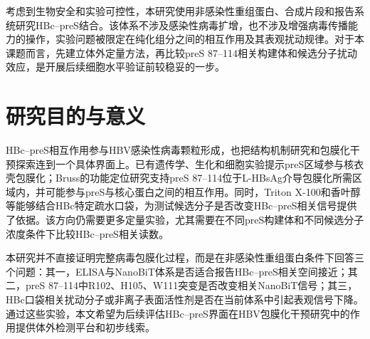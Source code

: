 考虑到生物安全和实验可控性，本研究使用非感染性重组蛋白、合成片段和报告系统研究HBc--preS结合。该体系不涉及感染性病毒扩增，也不涉及增强病毒传播能力的操作，实验问题被限定在纯化组分之间的相互作用及其表观扰动规律。对于本课题而言，先建立体外定量方法，再比较preS 87--114相关构建体和候选分子扰动效应，是开展后续细胞水平验证前较稳妥的一步。

\section{研究目的与意义}

HBc--preS相互作用参与HBV感染性病毒颗粒形成，也把结构机制研究和包膜化干预探索连到一个具体界面上。已有遗传学、生化和细胞实验提示preS区域参与核衣壳包膜化；Bruss的功能定位研究支持preS 87--114位于L-HBsAg介导包膜化所需区域内，并可能参与preS与核心蛋白之间的相互作用\cite{bruss1997short}。同时，Triton X-100和香叶醇等能够结合HBc特定疏水口袋\cite{makbul2021binding,khayenko2025induction}，为测试候选分子是否改变HBc--preS相关信号提供了依据。该方向仍需要更多定量实验，尤其需要在不同preS构建体和不同候选分子浓度条件下比较HBc--preS相关读数。

本研究并不直接证明完整病毒包膜化过程，而是在非感染性重组蛋白条件下回答三个问题：其一，ELISA与NanoBiT体系是否适合报告HBc--preS相关空间接近；其二，preS 87--114中R102、H105、W111突变是否改变相关NanoBiT信号；其三，HBc口袋相关扰动分子或非离子表面活性剂是否在当前体系中引起表观信号下降。通过这些实验，本文希望为后续评估HBc--preS界面在HBV包膜化干预研究中的作用提供体外检测平台和初步线索。
